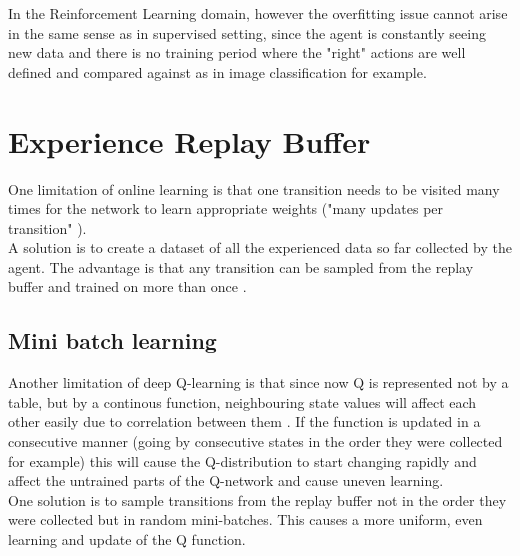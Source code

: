 In the Reinforcement Learning domain, however the 
overfitting issue cannot arise in the same sense as in
supervised setting, since the agent is constantly 
seeing new data and there is no training period where
the "right" actions are well defined and compared against
as in image classification for example.


\section{Experience Replay Buffer}

One limitation of online learning is that one transition needs to be visited many times for the network to learn appropriate weights ("many updates per transition" \cite{lecture_dqn}). \\

A solution is to create a dataset of all the experienced data so far collected by the agent. The advantage is that any transition can be sampled from the replay buffer and trained on more than once \cite{lecture_dqn}. 

\subsection{Mini batch learning }

Another limitation of deep Q-learning is that since now Q is represented not by a table, but by a continous function, neighbouring state values will affect each other easily due to correlation between them \cite{lecture_dqn} . If the function is updated in a consecutive manner (going by consecutive states in the order they were collected for example) this will cause the Q-distribution to start changing rapidly and affect the untrained parts of the Q-network and cause uneven learning. \\

One solution is to sample transitions from the replay buffer not in the order they were collected but in random mini-batches. This causes a more uniform, even learning and update of the Q function.  


